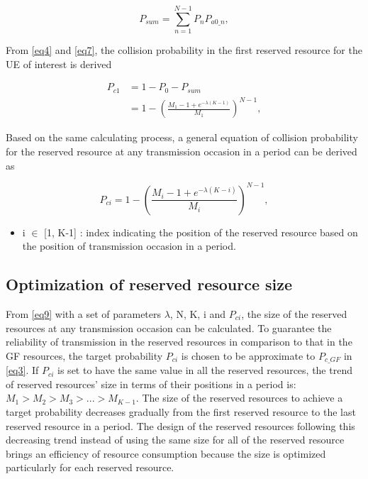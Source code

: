 \documentclass[conference]{IEEEtran}
\begin{document}
\begin{equation}
P_{sum} = \sum_{n=1}^{N-1} P_{n}P_{a0\_n},\label{eq7}
\end{equation}

From \eqref{eq4} and \eqref{eq7}, the collision probability in the first reserved resource for the UE of interest is derived

\begin{align}
P_{c1} &= 1 - P_{0} - P_{sum} \nonumber\\
 &= 1 - (\frac{M_{1}-1+e^{-\lambda(K-1)}}{M_{1}})^{N-1},\label{eq8}
\end{align}

Based on the same calculating process, a general equation of collision probability for the reserved resource at any transmission occasion in a period can be derived as

\begin{equation}
P_{ci} = 1 - (\frac{M_{i}-1+e^{-\lambda(K-i)}}{M_{i}})^{N-1},\label{eq9}
\end{equation}

\begin{itemize}
    \item i $\in$ [1, K-1] : index indicating the position of the reserved resource based on the position of transmission occasion in a period.
\end{itemize}

\subsection{Optimization of reserved resource size}\label{IIDD}
From \eqref{eq9} with a set of parameters  $\lambda$, N, K, i and $P_{ci}$, the size of the reserved resources at any transmission occasion can be calculated. To guarantee the reliability of transmission in the reserved resources in comparison to that in the GF resources, the target probability $P_{ci}$ is chosen to be approximate to $P_{c\_GF}$ in \eqref{eq3}. If $P_{ci}$ is set to have the same value in all the reserved resources, the trend of reserved resources' size in terms of their positions in a period is: $M_1 > M_2 > M_3 > ... > M_{K-1}$. The size of the reserved resources to achieve a target probability decreases gradually from the first reserved resource to the last reserved resource in a period. The design of the reserved resources following this decreasing trend instead of using the same size for all of the reserved resource brings an efficiency of resource consumption because the size is optimized particularly for each reserved resource.
\end{document}
